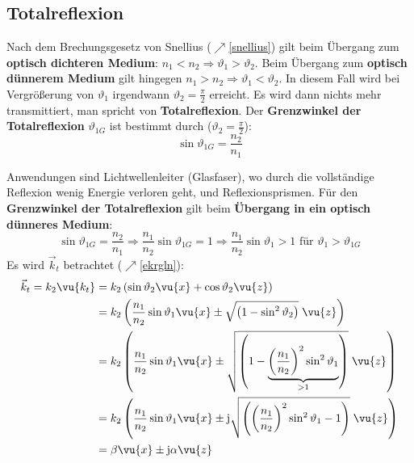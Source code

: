   \subsection{Totalreflexion}
		  Nach dem Brechungsgesetz von Snellius ($\nearrow$\ref{snellius}) gilt beim Übergang zum \textbf{optisch dichteren Medium}: \(n_1 < n_2\Rightarrow \vartheta_1 > \vartheta_2\). Beim Übergang zum \textbf{optisch dünnerem Medium} gilt hingegen \(n_1 > n_2\Rightarrow \vartheta_1 < \vartheta_2\). In diesem Fall wird bei Vergrößerung von \(\vartheta_1\) irgendwann \(\vartheta_2 = \frac{\pi}{2}\) erreicht. Es wird dann nichts mehr transmittiert, man spricht von \textbf{Totalreflexion}. Der \textbf{Grenzwinkel der Totalreflexion} \(\vartheta_{1G}\) ist bestimmt durch ($\vartheta_2 = \frac{\pi}{2}$):
			              \begin{equation}
				              \boxed{\sin\vartheta_{1G} = \frac{n_2}{n_1}}
			              \end{equation}
			              \begin{center}
				              
			              \end{center}
		Anwendungen sind Lichtwellenleiter (Glasfaser), wo durch die vollständige Reflexion wenig Energie verloren geht, und Reflexionsprismen. Für den \textbf{Grenzwinkel der Totalreflexion}  gilt beim \textbf{Übergang in ein optisch dünneres Medium}:
			        \begin{equation}
				        \sin\vartheta_{1G} = \frac{n_2}{n_1} \Rightarrow \frac{n_1}{n_2}\sin\vartheta_{1G} = 1 \Rightarrow \boxed{\frac{n_1}{n_2}\sin\vartheta_{1} > 1 \text{ für } \vartheta_{1}>\vartheta_{1G}}
			        \end{equation}
			  Es wird \(\vec{k}_t\) betrachtet ($\nearrow$\ref{ekrgln}):
			        \begin{equation}\begin{split}
					        \vec{k}_t= k_2 \vu{{k_t}} &=  k_2 \left( \sin\vartheta_2\vu{x} +   \cos\vartheta_2\vu{z}\right) \\
					        &=  k_2 \left(\frac{n_1}{n_2} \sin\vartheta_1\vu{x} \pm \sqrt{\left(1-   \sin^2\vartheta_2\right)}\;\vu{z}\right)\\
					        &=  k_2 \left(\frac{n_1}{n_2} \sin\vartheta_1\vu{x} \pm \sqrt{\left(1-  \underbrace{\left(\frac{n_1}{n_2}\right)^2 \sin^2\vartheta_1}_{>1}\right)}\;\vu{z}\right)\\
					        &=  k_2 \left(\frac{n_1}{n_2} \sin\vartheta_1\vu{x} \pm \mathrm{j}\sqrt{\left( \left(\frac{n_1}{n_2}\right)^2 \sin^2\vartheta_1-1\right)}\;\vu{z}\right)\\
					        &= \beta \vu{x} \pm \mathrm{j}\alpha \vu{z}
				        \end{split}\end{equation}
